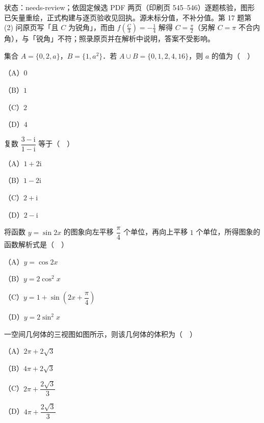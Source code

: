 

状态：needs-review；依固定候选 PDF 两页（印刷页 545–546）逐题核验，图形已矢量重绘，正式构建与逐页验收见回执。源未标分值，不补分值。第 17 题第 (2) 问原页写「且 $C$ 为锐角」，而由 $f\left(\frac C3\right)=-\frac14$ 解得 $C=\frac\pi2$（另解 $C=\pi$ 不合内角），与「锐角」不符；照录原页并在解析中说明，答案不受影响。


\begin{question}
集合 $A=\{0,2,a\}$，$B=\{1,a^2\}$．若 $A\cup B=\{0,1,2,4,16\}$，则 $a$ 的值为（　）

（A）$0$

（B）$1$

（C）$2$

（D）$4$

\end{question}
\begin{question}
复数 $\dfrac{3-\mathrm i}{1-\mathrm i}$ 等于（　）

（A）$1+2\mathrm i$

（B）$1-2\mathrm i$

（C）$2+\mathrm i$

（D）$2-\mathrm i$

\end{question}
\begin{question}
将函数 $y=\sin2x$ 的图象向左平移 $\dfrac{\pi}{4}$ 个单位，再向上平移 $1$ 个单位，所得图象的函数解析式是（　）

（A）$y=\cos2x$

（B）$y=2\cos^2x$

（C）$y=1+\sin\left(2x+\dfrac{\pi}{4}\right)$

（D）$y=2\sin^2x$

\Needspace{0.4\textheight}
\end{question}
\begin{question}
一空间几何体的三视图如图所示，则该几何体的体积为（　）

（A）$2\pi+2\sqrt3$

（B）$4\pi+2\sqrt3$

（C）$2\pi+\dfrac{2\sqrt3}{3}$

（D）$4\pi+\dfrac{2\sqrt3}{3}$
\nopagebreak[4]
\begin{center}\end{center}
\nopagebreak[4]
\end{question}
